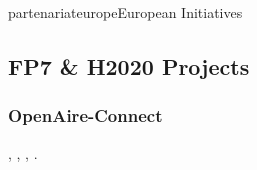 \documentclass{ra2018}
\begin{document}
\begin{module}{partenariat}{europe}{European Initiatives}

\subsection{FP7 \& H2020 Projects}








\subsubsection{OpenAire-Connect}
\begin{participants}    	
	, 	
	,
	,
	.
\end{participants}  


\end{module}
\end{document}
